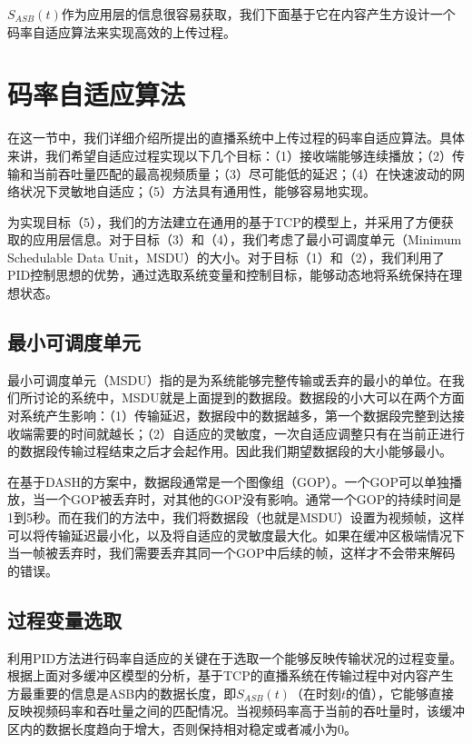 $S_{ASB}(t)$作为应用层的信息很容易获取，我们下面基于它在内容产生方设计一个码率自适应算法来实现高效的上传过程。


\section{码率自适应算法}

在这一节中，我们详细介绍所提出的直播系统中上传过程的码率自适应算法。具体来讲，我们希望自适应过程实现以下几个目标：（1）接收端能够连续播放；（2）传输和当前吞吐量匹配的最高视频质量；（3）尽可能低的延迟；（4）在快速波动的网络状况下灵敏地自适应；（5）方法具有通用性，能够容易地实现。

为实现目标（5），我们的方法建立在通用的基于TCP的模型上，并采用了方便获取的应用层信息。对于目标（3）和（4），我们考虑了最小可调度单元（Minimum Schedulable Data Unit，MSDU）的大小。对于目标（1）和（2），我们利用了PID控制思想的优势，通过选取系统变量和控制目标，能够动态地将系统保持在理想状态。

\subsection{最小可调度单元}

最小可调度单元（MSDU）指的是为系统能够完整传输或丢弃的最小的单位。在我们所讨论的系统中，MSDU就是上面提到的数据段。数据段的小大可以在两个方面对系统产生影响：（1）传输延迟，数据段中的数据越多，第一个数据段完整到达接收端需要的时间就越长；（2）自适应的灵敏度，一次自适应调整只有在当前正进行的数据段传输过程结束之后才会起作用。因此我们期望数据段的大小能够最小。

在基于DASH的方案中，数据段通常是一个图像组（GOP）\supercite{Cicco2011}。一个GOP可以单独播放，当一个GOP被丢弃时，对其他的GOP没有影响。通常一个GOP的持续时间是1到5秒。而在我们的方法中，我们将数据段（也就是MSDU）设置为视频帧，这样可以将传输延迟最小化，以及将自适应的灵敏度最大化。如果在缓冲区极端情况下当一帧被丢弃时，我们需要丢弃其同一个GOP中后续的帧，这样才不会带来解码的错误。

\subsection{过程变量选取}

利用PID方法进行码率自适应的关键在于选取一个能够反映传输状况的过程变量。根据上面对多缓冲区模型的分析，基于TCP的直播系统在传输过程中对内容产生方最重要的信息是ASB内的数据长度，即$S_{ASB}(t)$（在时刻$t$的值），它能够直接反映视频码率和吞吐量之间的匹配情况。当视频码率高于当前的吞吐量时，该缓冲区内的数据长度趋向于增大，否则保持相对稳定或者减小为0。

